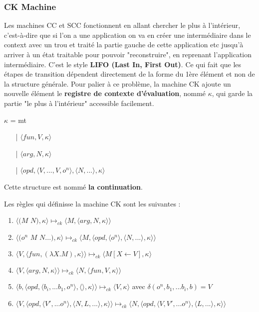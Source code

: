 \documentclass[10pt,a4paper]{article}
\begin{document}
			\subsubsection{CK Machine}
			
			Les machines CC et SCC fonctionnent en allant chercher le plus à l'intérieur, c'est-à-dire que si l'on a une application on va en créer une intermédiaire dans le context avec un trou et traité la partie gauche de cette application etc jusqu'à arriver à un état traitable pour pouvoir "reconstruire", en reprenant l'application intermédiaire. C'est le style \textbf{ LIFO (Last In, First Out)}. Ce qui fait que les étapes de transition dépendent directement de la forme du 1ère élément et non de la structure générale.
			\smallbreak
			Pour palier à ce problème, la machine CK ajoute un nouvelle élément le \textbf{registre de contexte d'évaluation}, nommé $\kappa$, qui garde la partie "le plus à l'intérieur" accessible facilement.
			\smallbreak
			
			$\kappa$ = mt
			\begin{itemize}
				\item[|] $\langle fun,V,\kappa \rangle$
				\item[|] $\langle arg,N,\kappa \rangle$
				\item[|] $\langle opd,\langle V,...,V,o^{n}\rangle,\langle N,... \rangle,\kappa \rangle$
			\end{itemize}
			
			Cette structure est nommé \textbf{la continuation}.
			\medbreak
			
			Les règles qui définisse la machine CK sont les suivantes :
			\begin{enumerate}
				\item $\langle(M$ $N),\kappa\rangle \longmapsto_{ck} \langle M,\langle arg,N,\kappa\rangle\rangle$
				\item $\langle(o^{n}$ $M$ $N...),\kappa\rangle \longmapsto_{ck} \langle M,\langle opd,\langle o^{n}\rangle,\langle N,...\rangle,\kappa\rangle\rangle$
				\item $\langle V,\langle fun,(\lambda X.M),\kappa \rangle \rangle \longmapsto_{ck} \langle M[X \leftarrow V],\kappa\rangle$
				\item $\langle V,\langle arg,N,\kappa \rangle \rangle \longmapsto_{ck} \langle N,\langle fun,V,\kappa \rangle \rangle$
				\item $\langle b,\langle opd,\langle b_{i},...b_{1},o^{n}\rangle,\langle\rangle,\kappa\rangle\rangle \longmapsto_{ck} \langle V,\kappa\rangle$ avec $\delta(o^{n},b_{1},...b_{i},b) = V$
				\item $\langle V,\langle opd,\langle V',...o^{n}\rangle,\langle N,L,...\rangle,\kappa\rangle\rangle \longmapsto_{ck} \langle N,\langle opd,\langle V,V',...o^{n}\rangle,\langle L,...\rangle,\kappa\rangle\rangle$
			\end{enumerate}
			\bigbreak
			
\end{document}
